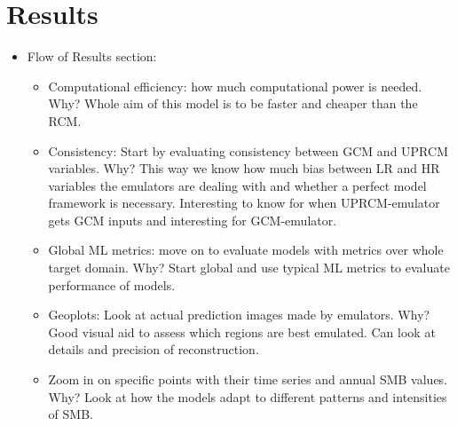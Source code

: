 \documentclass[a4paper,11pt,oneside]{report}
\begin{document}

\chapter{Results}

\begin{itemize}
    \item Flow of Results section:
    \begin{itemize}
    \item Computational efficiency: how much computational power is needed. Why? Whole aim of this model is to be faster and cheaper than the RCM. 
    \item Consistency: Start by evaluating consistency between GCM and UPRCM variables. Why? This way we know how much bias between LR and HR variables the emulators are dealing with and whether a perfect model framework is necessary. Interesting to know for when UPRCM-emulator gets GCM inputs and interesting for GCM-emulator. 
        \item Global ML metrics: move on to evaluate models with metrics over whole target domain. Why? Start global and use typical ML metrics to evaluate performance of models.  
        \item Geoplots: Look at actual prediction images made by emulators. Why? Good visual aid to assess which regions are best emulated. Can look at details and precision of reconstruction.   
        \item Zoom in on specific points with their time series and annual SMB values. Why? Look at how the models adapt to different patterns and intensities of SMB. 
    \end{itemize} 
\end{itemize}
\end{document}
